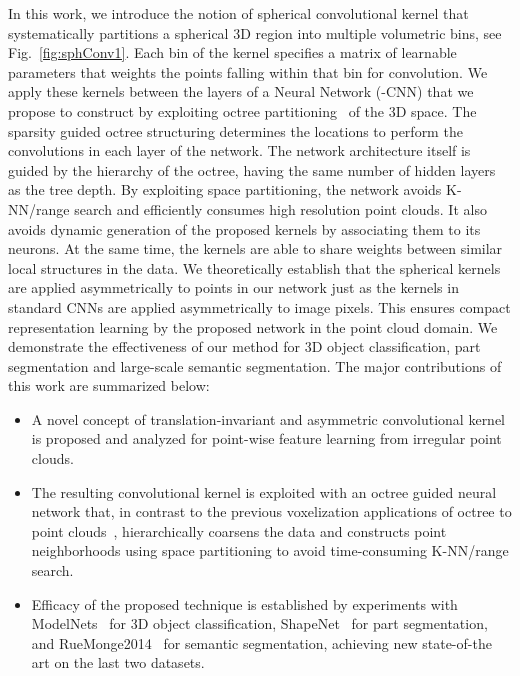 \documentclass[10pt,twocolumn,letterpaper]{article}
\begin{document}
In this work, we introduce the notion of spherical convolutional kernel that systematically partitions a spherical 3D region into multiple volumetric bins, see Fig.~\ref{fig:sphConv1}. Each bin of the kernel specifies a matrix of learnable parameters that weights the points falling within that bin for convolution.
We apply these kernels between the layers of a Neural Network (-CNN) that we propose to construct by exploiting octree partitioning~\cite{meagher1982geometric} of the 3D space. The sparsity guided octree structuring determines the locations to perform the convolutions in each layer of the network. The network architecture itself is guided by the hierarchy of the octree, having the same number of hidden layers as the tree depth. By exploiting space partitioning, the network avoids K-NN/range search and efficiently consumes high resolution point clouds. 
It also avoids dynamic generation of the proposed kernels by associating them to its neurons. At the same time, 
the kernels are able to share weights between similar local structures in the data. We theoretically establish that the spherical kernels are applied asymmetrically to points in our network just as the kernels in standard CNNs are applied asymmetrically to image pixels. This ensures compact representation learning by the proposed network in the point cloud domain.  
We demonstrate the effectiveness of our method for 
3D object classification, part segmentation and large-scale semantic segmentation. 
The major contributions of this work are summarized  below:
\begin{itemize}
\item A novel concept of translation-invariant and asymmetric convolutional kernel is proposed and analyzed for point-wise feature learning from irregular point clouds. 
\item The resulting convolutional kernel is exploited with an octree guided neural network that, in contrast to the previous voxelization applications of octree to point clouds~\cite{riegler2016octnet}, hierarchically coarsens the data and constructs point neighborhoods using space partitioning to avoid time-consuming K-NN/range search.
\item Efficacy of the proposed technique is established by experiments with ModelNets~\cite{wu20153d} for 3D object classification, ShapeNet~\cite{yi2016scalable} for part segmentation, and  RueMonge2014~\cite{riemenschneider2014learning} for semantic segmentation, achieving new state-of-the art on the last two datasets.   
\end{itemize}
\end{document}
